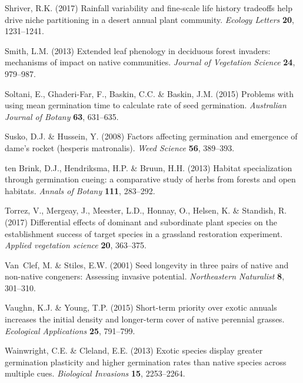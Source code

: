 \documentclass{article}[11pt]
\begin{document}
\begin{thebibliography}{62}
Shriver, R.K. (2017) Rainfall variability and fine-scale life history tradeoffs
  help drive niche partitioning in a desert annual plant community.
  \emph{Ecology Letters} \textbf{20}, 1231--1241.

Smith, L.M. (2013) Extended leaf phenology in deciduous forest invaders:
  mechanisms of impact on native communities. \emph{Journal of Vegetation
  Science} \textbf{24}, 979--987.

Soltani, E., Ghaderi-Far, F., Baskin, C.C. \& Baskin, J.M. (2015) Problems with
  using mean germination time to calculate rate of seed germination.
  \emph{Australian Journal of Botany} \textbf{63}, 631--635.

Susko, D.J. \& Hussein, Y. (2008) Factors affecting germination and emergence
  of dame's rocket (hesperis matronalis). \emph{Weed Science} \textbf{56},
  389--393.

ten Brink, D.J., Hendriksma, H.P. \& Bruun, H.H. (2013) Habitat specialization
  through germination cueing: a comparative study of herbs from forests and
  open habitats. \emph{Annals of Botany} \textbf{111}, 283--292.

Torrez, V., Mergeay, J., Meester, L.D., Honnay, O., Helsen, K. \& Standish, R.
  (2017) Differential effects of dominant and subordinate plant species on the
  establishment success of target species in a grassland restoration
  experiment. \emph{Applied vegetation science} \textbf{20}, 363--375.

Van~Clef, M. \& Stiles, E.W. (2001) Seed longevity in three pairs of native and
  non-native congeners: Assessing invasive potential. \emph{Northeastern
  Naturalist} \textbf{8}, 301--310.

Vaughn, K.J. \& Young, T.P. (2015) Short-term priority over exotic annuals
  increases the initial density and longer-term cover of native perennial
  grasses. \emph{Ecological Applications} \textbf{25}, 791--799.

Wainwright, C.E. \& Cleland, E.E. (2013) Exotic species display greater
  germination plasticity and higher germination rates than native species
  across multiple cues. \emph{Biological Invasions} \textbf{15}, 2253--2264.


\end{thebibliography}
\end{document}
